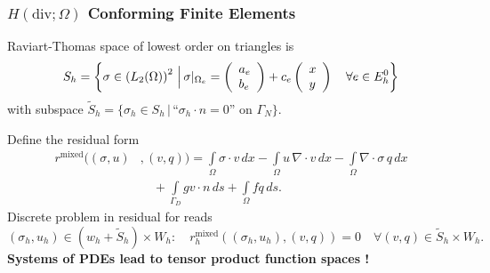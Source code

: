 \begin{frame}
\frametitle{$H(\text{div};\Omega)$ Conforming Finite Elements}
Raviart-Thomas space of lowest order on triangles is
\begin{align*}
S_h = \left\{\sigma\in\left(L_2(\Omega) \right)^2  \,\Bigl|\, \sigma|_{\Omega_e} =
\left(\begin{array}{l} a_e\\ b_e \end{array}\right) + 
c_e \left(\begin{array}{l} x\\ y \end{array}\right) \quad\forall e\in E^0_h
\right\}
\end{align*}
with subspace $\tilde{S}_h = \{\sigma_h\in S_h \,|\, \text{``$\sigma_h\cdot n=0$'' on $\Gamma_N$} \}$.

Define the residual form
\begin{equation*}
\begin{split}
r^\text{mixed}((\sigma,u)&,(v,q)) = 
\int\limits_\Omega \sigma\cdot v \, dx  -\int\limits_\Omega
u \, \nabla\cdot v \, dx 
 - \int\limits_\Omega \nabla\cdot\sigma \, q \, dx\\ 
&\quad + \int\limits_{\Gamma_D} g v\cdot n \, ds + \int\limits_\Omega f q \,
ds .
\end{split}
\end{equation*}
Discrete problem in residual for reads
\begin{equation*}
(\sigma_h, u_h) \in (w_h+\tilde{S}_h)\times W_h : \quad 
r_h^\text{mixed}\left((\sigma_h,u_h),(v,q)\right) = 0 \quad \forall
(v,q) \in \tilde{S}_h\times W_h .
\end{equation*}
\textbf{Systems of PDEs lead to tensor product function spaces !}
\end{frame}

